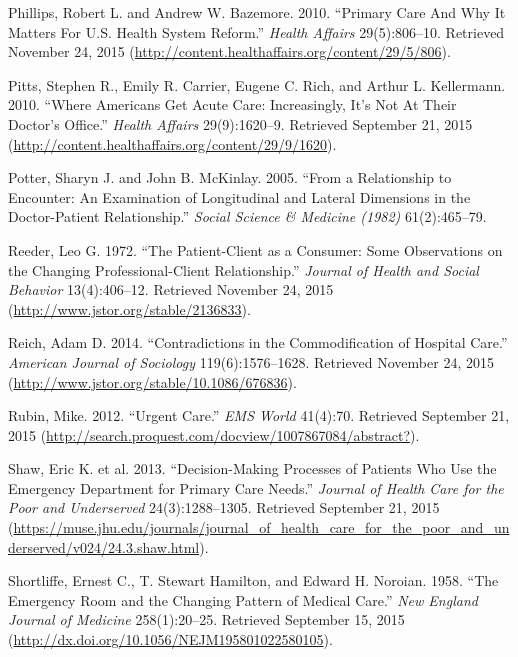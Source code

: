 \documentclass[12pt,twoside]{reedthesis}
\begin{document}
  \hypertarget{ref-phillipsux5fprimaryux5f2010}{}
  Phillips, Robert L. and Andrew W. Bazemore. 2010. ``Primary Care And Why
  It Matters For U.S. Health System Reform.'' \emph{Health Affairs}
  29(5):806--10. Retrieved November 24, 2015
  (\url{http://content.healthaffairs.org/content/29/5/806}).
  
  \hypertarget{ref-pittsux5fwhereux5f2010}{}
  Pitts, Stephen R., Emily R. Carrier, Eugene C. Rich, and Arthur L.
  Kellermann. 2010. ``Where Americans Get Acute Care: Increasingly, It's
  Not At Their Doctor's Office.'' \emph{Health Affairs} 29(9):1620--9.
  Retrieved September 21, 2015
  (\url{http://content.healthaffairs.org/content/29/9/1620}).
  
  \hypertarget{ref-potterux5frelationshipux5f2005}{}
  Potter, Sharyn J. and John B. McKinlay. 2005. ``From a Relationship to
  Encounter: An Examination of Longitudinal and Lateral Dimensions in the
  Doctor-Patient Relationship.'' \emph{Social Science \& Medicine (1982)}
  61(2):465--79.
  
  \hypertarget{ref-reederux5fpatient-clientux5f1972}{}
  Reeder, Leo G. 1972. ``The Patient-Client as a Consumer: Some
  Observations on the Changing Professional-Client Relationship.''
  \emph{Journal of Health and Social Behavior} 13(4):406--12. Retrieved
  November 24, 2015 (\url{http://www.jstor.org/stable/2136833}).
  
  \hypertarget{ref-reichux5fcontradictionsux5f2014}{}
  Reich, Adam D. 2014. ``Contradictions in the Commodification of Hospital
  Care.'' \emph{American Journal of Sociology} 119(6):1576--1628.
  Retrieved November 24, 2015
  (\url{http://www.jstor.org/stable/10.1086/676836}).
  
  \hypertarget{ref-rubinux5furgentux5f2012}{}
  Rubin, Mike. 2012. ``Urgent Care.'' \emph{EMS World} 41(4):70. Retrieved
  September 21, 2015
  (\url{http://search.proquest.com/docview/1007867084/abstract?}).
  
  \hypertarget{ref-shawux5f2013}{}
  Shaw, Eric K. et al. 2013. ``Decision-Making Processes of Patients Who
  Use the Emergency Department for Primary Care Needs.'' \emph{Journal of
  Health Care for the Poor and Underserved} 24(3):1288--1305. Retrieved
  September 21, 2015
  (\url{https://muse.jhu.edu/journals/journal_of_health_care_for_the_poor_and_underserved/v024/24.3.shaw.html}).
  
  \hypertarget{ref-SHORTLIFFEux5f1958}{}
  Shortliffe, Ernest C., T. Stewart Hamilton, and Edward H. Noroian. 1958.
  ``The Emergency Room and the Changing Pattern of Medical Care.''
  \emph{New England Journal of Medicine} 258(1):20--25. Retrieved
  September 15, 2015
  (\url{http://dx.doi.org/10.1056/NEJM195801022580105}).
  
\end{document}
